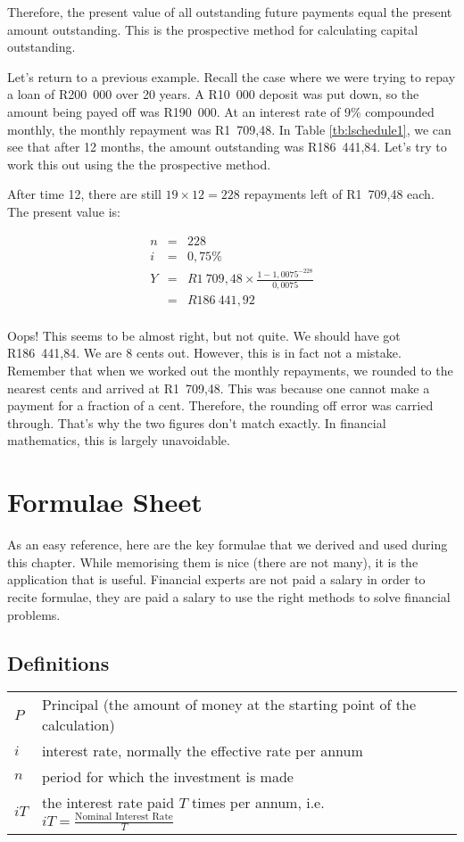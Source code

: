 Therefore, the present value of all outstanding future payments equal the present amount outstanding. This is the prospective method for calculating capital outstanding.

Let's return to a previous example. Recall the case where we were trying to repay a loan of R200~000 over 20 years. A R10~000 deposit was put down, so the amount being payed off was R190~000. At an interest rate of 9\% compounded monthly, the monthly repayment was R1~709,48. In Table \ref{tb:lschedule1}, we can see that after 12 months, the amount outstanding was R186~441,84. Let's try to work this out using the the prospective method.

After time 12, there are still $19 \times 12 = 228$ repayments left of R1~709,48 each. The present value is:

\begin{eqnarray*}
n &=& 228\\
i &=& 0,75\%\\
Y &=&R1~709,48 \times \frac{1-1,0075^{-228}}{0,0075}\\
&=& R186~441,92\\
\end{eqnarray*}

Oops! This seems to be almost right, but not quite. We should have got R186~441,84. We are 8 cents out. However, this is in fact not a mistake. Remember that when we worked out the monthly repayments, we rounded to the nearest cents and arrived at R1~709,48. This was because one cannot make a payment for a fraction of a cent. Therefore, the rounding off error was carried through. That's why the two figures don't match exactly. In financial mathematics, this is largely unavoidable.


\section{Formulae Sheet}
As an easy reference, here are the key formulae that we derived and used during this chapter. While memorising them is nice (there are not many), it is the application that is useful. Financial experts are not paid a salary in order to recite formulae, they are paid a salary to use the right methods to solve financial problems.

\subsection{Definitions}
\begin{tabular}{ll}
$P$ &Principal (the amount of money at the starting point of the calculation)\\
$i$ &interest rate, normally the effective rate per annum\\
$n$ &period for which the investment is made\\
$iT$ &the interest rate paid $T$ times per annum, i.e. $iT = \frac{\mbox{Nominal Interest Rate}}{T}$
\end{tabular}

